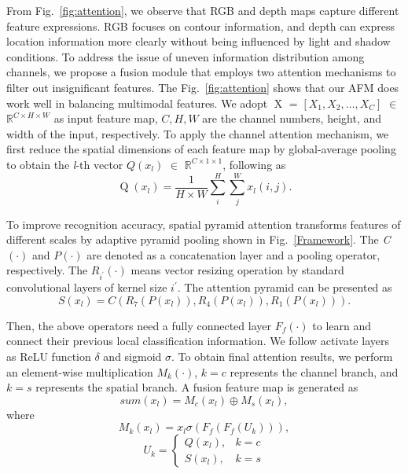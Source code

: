 \documentclass[journal,twoside,web]{ieeecolor}
\begin{document}
From Fig.~\ref{fig:attention}, we observe that RGB and depth maps capture different feature expressions. RGB focuses on contour information, and depth can express location information more clearly without being influenced by light and shadow conditions. To address the issue of uneven information distribution among channels, we propose a fusion module that employs two attention mechanisms to filter out insignificant features. The Fig.~\ref{fig:attention} shows that our AFM does work well in balancing multimodal features.
We adopt $\mathop X$ = $\left[ {{X_1},{X_2}, \ldots ,{X_C}} \right]$ $\in$ ${\mathbb{R}^{C \times H \times W}}$ as input feature map, $
C, H, W
$ are the channel numbers, height, and width of the input, respectively.
To apply the channel attention mechanism, we first reduce the spatial dimensions of each feature map by global-average pooling to obtain the \textit{l}-th vector $Q\left( {{x_l}} \right)$ $\in$ ${\mathbb{R}^{C \times 1 \times 1}}$, following as
 \begin{equation}
 		\mathop Q\left( {{x_l}} \right) = \frac{1}{{H \times W}}\sum\limits_i^H {\sum\limits_j^W {{{x_l}}\left( {i,j} \right)} }.
 \end{equation}

To improve recognition accuracy, spatial pyramid attention transforms features of different scales by adaptive pyramid pooling shown in Fig.~\ref{Framework}. The \textit{C$\left( { \cdot  } \right)$} and $P\left( { \cdot  } \right)$ are denoted as a concatenation layer and a pooling operator, respectively. The $R_{i^{\prime}}(\cdot)$ means vector resizing operation by standard convolutional layers of kernel size $i^{\prime}$. The attention pyramid can be presented as
\begin{equation}
 S\left( {{x_l}} \right) =C\left( {{R_7}\left( {P\left( {{x_l}} \right)} \right),{R_4}\left( {P\left( {{x_l}} \right)} \right),{R_1}\left( {P\left( {{x_l}} \right)} \right)} \right).
\end{equation}
 
Then, the above operators need a fully connected layer ${F_f}\left(  \cdot  \right)$ to learn and connect their previous local classification information. We follow activate layers as ReLU function $\delta$ and sigmoid $\sigma$. To obtain final attention results, we perform an element-wise multiplication ${M_k}\left( { \cdot} \right) $, $k=c$ represents the channel branch, and $k=s$ represents the spatial branch. A fusion feature map is generated as
\begin{equation}
sum\left({{x_l}} \right) = {M_c}\left( {{x_l}} \right) \oplus {M_s}\left( {{x_l}} \right),
\end{equation}
where 
\begin{equation}
	{M_k}\left( {{x_l}} \right) = {x_l} \sigma \left( {{F_f}\left( {{F_f}\left( {{U_k}} \right)} \right)} \right),
\end{equation}
\begin{equation}
U_k= \begin{cases}Q\left(x_l\right), & k=c \\ S\left(x_l\right), & k=s\end{cases}
\end{equation}
\end{document}

